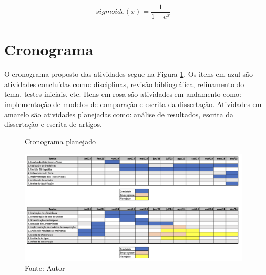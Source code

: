 \begin{equation}
\textit{sigmoide}(x) = \frac{1}{1 + e^x}
\label{eq:sigmoide}
\end{equation}

\section{Cronograma}
\label{sec:cronograma}

O cronograma proposto das atividades segue na Figura \ref{fig:fig014}. Os itens em azul são atividades concluídas como: disciplinas, revisão bibliográfica, refinamento do tema, testes iniciais, etc. Itens em rosa são atividades em andamento como: implementação de modelos de comparação e escrita da dissertação. Atividades em amarelo são atividades planejadas como: análise de resultados, escrita da dissertação e escrita de artigos.

\begin{figure}[htbp]
    \centering
    \caption{Cronograma planejado}
    \includegraphics[width=1\textwidth]{figures/fig014.png}
    \caption*{Fonte: Autor}
    \label{fig:fig014}
\end{figure}
